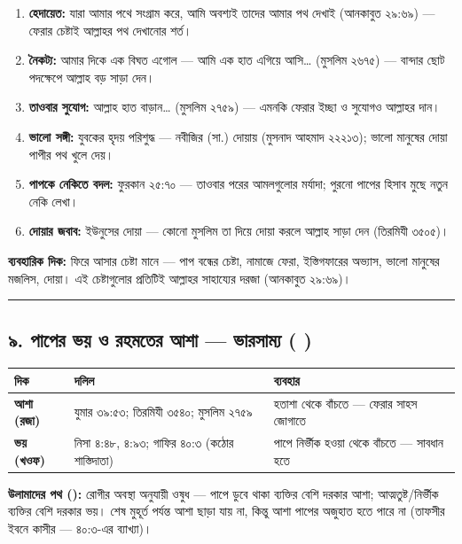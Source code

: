 \begin{enumerate}
\item \textbf{হেদায়েত:} যারা আমার পথে সংগ্রাম করে, আমি অবশ্যই তাদের আমার পথ দেখাই (আনকাবুত ২৯:৬৯) — ফেরার চেষ্টাই আল্লাহর পথ দেখানোর শর্ত।
\item \textbf{নৈকট্য:} আমার দিকে এক বিঘত এগোল — আমি এক হাত এগিয়ে আসি… (মুসলিম ২৬৭৫) — বান্দার ছোট পদক্ষেপে আল্লাহ বড় সাড়া দেন।
\item \textbf{তাওবার সুযোগ:} আল্লাহ হাত বাড়ান… (মুসলিম ২৭৫৯) — এমনকি ফেরার ইচ্ছা ও সুযোগও আল্লাহর দান।
\item \textbf{ভালো সঙ্গী:} যুবকের হৃদয় পরিশুদ্ধ — নবীজির (সা.) দোয়ায় (মুসনাদ আহমাদ ২২২১৩); ভালো মানুষের দোয়া পাপীর পথ খুলে দেয়।
\item \textbf{পাপকে নেকিতে বদল:} ফুরকান ২৫:৭০ — তাওবার পরের আমলগুলোর মর্যাদা; পুরনো পাপের হিসাব মুছে নতুন নেকি লেখা।
\item \textbf{দোয়ার জবাব:} ইউনুসের দোয়া — কোনো মুসলিম তা দিয়ে দোয়া করলে আল্লাহ সাড়া দেন (তিরমিযী ৩৫০৫)।
\end{enumerate}
\textbf{ব্যবহারিক দিক:} ফিরে আসার চেষ্টা মানে — পাপ বন্ধের চেষ্টা, নামাজে ফেরা, ইস্তিগফারের অভ্যাস, ভালো মানুষের মজলিস, দোয়া। এই চেষ্টাগুলোর প্রতিটিই আল্লাহর সাহায্যের দরজা (আনকাবুত ২৯:৬৯)।

\medskip\hrule\medskip

\subsection*{৯. পাপের ভয় ও রহমতের আশা — ভারসাম্য (    )}

\begin{table}[h]\centering\small
\begin{tabular}{lll}
দিক & দলিল & ব্যবহার \\
\hline
\textbf{আশা (রজা)} & যুমার ৩৯:৫৩; তিরমিযী ৩৫৪০; মুসলিম ২৭৫৯ & হতাশা থেকে বাঁচতে — ফেরার সাহস জোগাতে \\
\textbf{ভয় (খওফ)} & নিসা ৪:৪৮, ৪:৯৩; গাফির ৪০:৩ (\lat{“}কঠোর শাস্তিদাতা\lat{”}) & পাপে নির্ভীক হওয়া থেকে বাঁচতে — সাবধান হতে \\
\hline
\end{tabular}
\end{table}

\textbf{উলামাদের পথ ():} রোগীর অবস্থা অনুযায়ী ওষুধ — পাপে ডুবে থাকা ব্যক্তির বেশি দরকার আশা; আত্মতুষ্ট/নির্ভীক ব্যক্তির বেশি দরকার ভয়। শেষ মুহূর্ত পর্যন্ত আশা ছাড়া যায় না, কিন্তু আশা পাপের অজুহাত হতে পারে না (তাফসীর ইবনে কাসীর — ৪০:৩-এর ব্যাখ্যা)।

